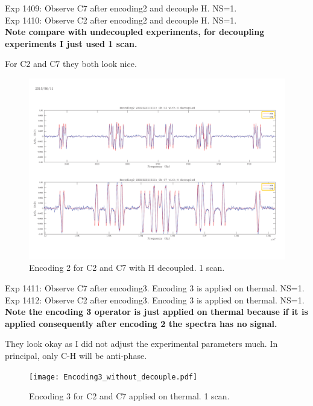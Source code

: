 \clearpage
Exp 1409: Observe C7 after encoding2 and decouple H. NS=1.\\
Exp 1410: Observe C2 after encoding2 and decouple H. NS=1.\\
\textbf{Note compare with undecoupled experiments, for decoupling experiments I just used 1 scan.}

For C2 and C7 they both look nice.

\begin{figure}[htb]
\begin{center}
\includegraphics[width=\columnwidth]{Encoding2_with_decouple.pdf}
\end{center}
\setlength{\abovecaptionskip}{-0.35cm}
\caption{\footnotesize{Encoding 2 for C2 and C7 with H decoupled. 1 scan.}}\label{1409and1410}
\end{figure}

\clearpage
Exp 1411: Observe C7 after encoding3. Encoding 3 is applied on thermal. NS=1.\\
Exp 1412: Observe C2 after encoding3. Encoding 3 is applied on thermal. NS=1.\\
\textbf{Note the encoding 3 operator is just applied on thermal because if it is applied consequently after encoding 2 the spectra has no signal.}

They look okay as I did not adjust the experimental parameters much. In principal, only C-H will be anti-phase.

\begin{figure}[htb]
\begin{center}
\texttt{[image: Encoding3\_without\_decouple.pdf]}
\end{center}
\setlength{\abovecaptionskip}{-0.35cm}
\caption{\footnotesize{Encoding 3 for C2 and C7 applied on thermal. 1 scan.}}\label{1411and1412}
\end{figure}